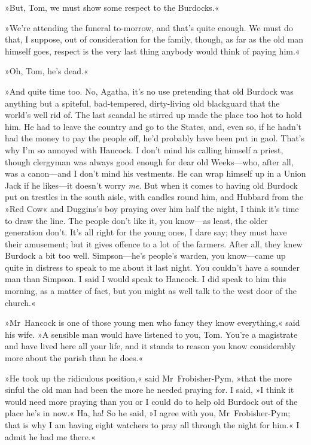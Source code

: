 »But, Tom, we must show some respect to the Burdocks.«

»We're attending the funeral to-morrow, and that's quite enough. We must do that, I suppose, out of consideration for the family, though, as far as the old man himself goes, respect is the very last thing anybody would think of paying him.«

»Oh, Tom, he's dead.«

»And quite time too. No, Agatha, it's no use pretending that old Burdock was anything but a spiteful, bad-tempered, dirty-living old blackguard that the world's well rid of. The last scandal he stirred up made the place too hot to hold him. He had to leave the country and go to the States, and, even so, if he hadn't had the money to pay the people off, he'd probably have been put in gaol. That's why I'm so annoyed with Hancock. I don't mind his calling himself a priest, though clergyman was always good enough for dear old Weeks—who, after all, was a canon—and I don't mind his vestments. He can wrap himself up in a Union Jack if he likes—it doesn't worry \textit{me}. But when it comes to having old Burdock put on trestles in the south aisle, with candles round him, and Hubbard from the »Red Cow« and Duggins's boy praying over him half the night, I think it's time to draw the line. The people don't like it, you know—as least, the older generation don't. It's all right for the young ones, I dare say; they must have their amusement; but it gives offence to a lot of the farmers. After all, they knew Burdock a bit too well. Simpson—he's people's warden, you know—came up quite in distress to speak to me about it last night. You couldn't have a sounder man than Simpson. I said I would speak to Hancock. I did speak to him this morning, as a matter of fact, but you might as well talk to the west door of the church.«

»Mr~Hancock is one of those young men who fancy they know everything,« said his wife. »A sensible man would have listened to you, Tom. You're a magistrate and have lived here all your life, and it stands to reason you know considerably more about the parish than he does.«

»He took up the ridiculous position,« said Mr~Frobisher-Pym, »that the more sinful the old man had been the more he needed praying for. I said, »I think it would need more praying than you or I could do to help old Burdock out of the place he's in now.« Ha, ha! So he said, »I agree with you, Mr~Frobisher-Pym; that is why I am having eight watchers to pray all through the night for him.« I admit he had me there.«

